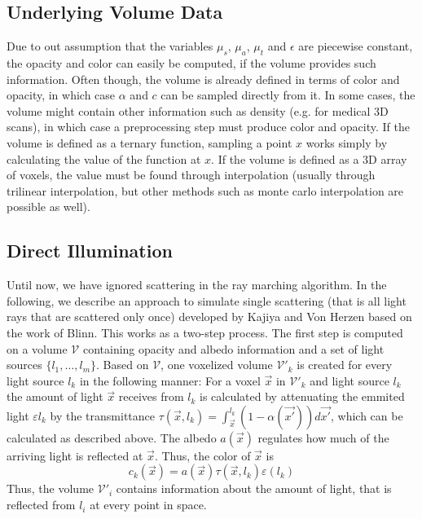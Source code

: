 \subsection{Underlying Volume Data}
Due to out assumption that the variables $\mu_s$, $\mu_a$, $\mu_t$ and $\epsilon$ are piecewise constant, the opacity and color can easily be computed, if the volume provides such information. Often though, the volume is already defined in terms of color and opacity, in which case $\alpha$ and $c$ can be sampled directly from it.
In some cases, the volume might contain other information such as density (e.g. for medical 3D scans), in which case a preprocessing step\cite{511} must produce color and opacity.
If the volume is defined as a ternary function, sampling a point $x$ works simply by calculating the value of the function at $x$. If the volume is defined as a 3D array of voxels, the value must be found through interpolation (usually through trilinear interpolation\cite{511}, but other methods such as monte carlo interpolation\cite{10.1145/3451256} are possible as well).


\subsection{Direct Illumination}
Until now, we have ignored scattering in the ray marching algorithm. In the following, we describe an approach to simulate single scattering (that is all light rays that are scattered only once) developed by Kajiya and Von Herzen\cite{10.1145/964965.808594} based on the work of Blinn\cite{10.1145/965145.801255}.
This works as a two-step process.
The first step is computed on a volume $\mathcal{V}$ containing opacity and albedo information and a set of light sources $\{l_1, \ldots, l_m\}$.
Based on $\mathcal{V}$, one voxelized volume $\mathcal{V'}_k$ is created for every light source $l_k$ in the following manner:
For a voxel $\vec{x}$ in $\mathcal{V'}_k$ and light source $l_k$ the amount of light $\vec{x}$ receives from $l_k$ is calculated by attenuating the emmited light $\varepsilon{l_k}$ by the transmittance $\tau(\vec{x}, l_k) = \int_{\vec{x}}^{l_k}(1 - \alpha(\vec{x'}))d\vec{x'}$, which can be calculated as described above.
 The albedo $a(\vec{x})$ regulates how much of the arriving light is reflected at $\vec{x}$. Thus, the color of $\vec{x}$ is
\begin{equation}
c_k(\vec{x}) = a(\vec{x}) \tau(\vec{x}, l_k) \varepsilon(l_k)
\end{equation}
Thus, the volume $\mathcal{V'}_i$ contains information about the amount of light, that is reflected from $l_i$ at every point in space.

